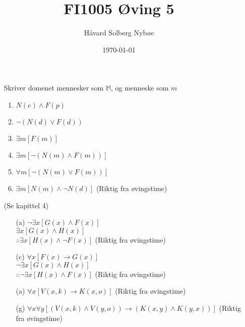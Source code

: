 \documentclass[a4paper, 12pt]{article}  %
\title{FI1005 Øving 5}                         %
\author{Håvard Solberg Nybøe}           %
\date{\today}                           %
\begin{document}
\maketitle


\begin{enumerate}
    \item [\boxed{1}] Skriver domenet mennesker som \(\mathbb{M}\), og menneske som \(m\)
    \begin{enumerate}
        \item \(N(e) \land F(p)\)
        \item \(\neg(N(d) \lor F(d))\)
        \item \(\exists m [F(m)]\)
        \item \(\exists m [\neg(N(m) \land F(m))]\)
        \item \(\forall m [\neg(N(m) \lor F(m))]\)
        \item \(\exists m [N(m) \land \neg N(d)] \) (Riktig fra øvingstime)
    \end{enumerate}
    \item [\boxed{2}] (Se kapittel 4)
    \begin{enumerate}
        \item [(a)]
        \(\neg\exists x [G(x) \land F(x)]\) \\
        \(\exists x [G(x) \land H(x)]\) \\
        \(\therefore\exists x [H(x) \land \neg F(x)]\) (Riktig fra øvingstime)
        \item [(c)]
        \(\forall x [F(x) \to G(x)]\) \\
        \(\neg\exists x [G(x) \land H(x)]\) \\
        \(\therefore\neg\exists x [H(x) \land F(x)]\) (Riktig fra øvingstime)
    \end{enumerate}
    \item [\boxed{3}]
    \begin{enumerate}
        \item [(a)]
        \(\forall x [V(x,k) \to K(x,o)] \) (Riktig fra øvingstime)
        \item [(g)]
        \(\forall x \forall y [(V(x,k) \land V(y,o)) \to (K(x,y) \land K(y,x))] \) (Riktig fra øvingstime)
    \end{enumerate}
\end{enumerate}

\end{document}
